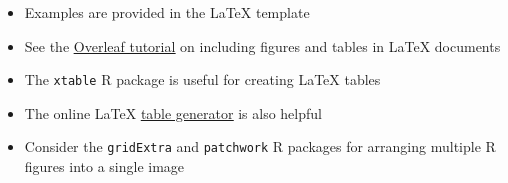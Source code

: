 \documentclass[11pt]{article}
\begin{document}
\begin{itemize}
\item Examples are provided in the LaTeX template
\item See the \href{https://www.overleaf.com/learn/latex/How_to_Write_a_Thesis_in_LaTeX_(Part_3)\%3A_Figures\%2C_Subfigures_and_Tables}{\underline{Overleaf tutorial}} on including figures and tables in LaTeX documents
\item The \verb;xtable; R package is useful for creating LaTeX tables
\item The online LaTeX \href{https://www.tablesgenerator.com/}{\underline{table generator}} is also helpful
\item Consider the \verb;gridExtra; and \verb;patchwork; R packages for arranging multiple R figures into a single image
\end{itemize}
\end{document}

